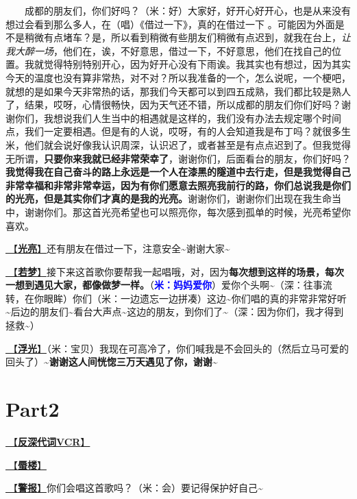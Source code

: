 \documentclass[]{ctexbook}
\begin{document}
  成都的朋友们，你们好吗？（米：好）大家好，好开心好开心，也是从来没有想过会看到那么多人，在（唱）《借过一下》，真的在借过一下 。可能因为外面是不是稍微有点堵车？是，所以看到稍微有些朋友们稍微有点迟到，就我在台上，\emph{让我大醉一场}，他们在，诶，不好意思，借过一下，不好意思，他们在找自己的位置。我就觉得特别特别开心，因为好开心没有下雨诶。我其实也有想过，因为其实今天的温度也没有算非常热，对不对？所以我准备的一个，怎么说呢，一个梗吧，就想的是如果今天非常热的话，那我们今天都可以到四五成熟，我们都比较是熟人了，结果，哎呀，心情很畅快，因为天气还不错，所以成都的朋友们你们好吗？谢谢你们，我想说我们人生当中的相遇就是这样的，我们没有办法去规定哪个时间点，我们一定要相遇。但是有的人说，哎呀，有的人会知道我是布丁吗？就很多生米，他们就会说好像我认识周深，认识迟了，或者甚至是有点点迟到了。但我觉得无所谓，\textbf{只要你来我就已经非常荣幸了}，谢谢你们，后面看台的朋友，你们好吗？\textbf{我觉得我在自己奋斗的路上永远是一个人在漆黑的隧道中去行走，但是我觉得自己非常幸福和非常非常幸运，因为有你们愿意去照亮我前行的路，你们总说我是你们的光亮，但是其实你们才真的是我的光亮。}谢谢你们，谢谢你们出现在我生命当中，谢谢你们。那这首光亮希望也可以照亮你，每次感到孤单的时候，光亮希望你喜欢。

\hyperref[silver-linings]{🎵【\textbf{光亮}】}还有朋友在借过一下，注意安全\textasciitilde 谢谢大家\textasciitilde{}

\hyperref[ruomeng]{🎵【\textbf{若梦}】}接下来这首歌你要帮我一起唱哦，对，因为\textbf{每次想到这样的场景，每次一想到遇见大家，都像做梦一样。}（\textbf{\textcolor{blue}{米：妈妈爱你}}）爱你个头啊\textasciitilde（深：往事流转，在你眼眸）你们（米：一边遗忘一边拼凑）这边\textasciitilde 你们唱的真的非常非常好听\textasciitilde 后边的朋友们\textasciitilde 看台大声点\textasciitilde 这边的朋友，到你们了\textasciitilde（深：因为你们，我才得到拯救\textasciitilde）

\hyperref[floating-light]{🎵【\textbf{浮光}】}（米：宝贝）我现在可高冷了，你们喊我是不会回头的（然后立马可爱的回头了）\textasciitilde{}\textbf{谢谢这人间恍惚三万天遇见了你，谢谢\textasciitilde{}}

\section{Part2}\label{chengdu-20240615-part2}

\hyperref[senself-vcr]{🎥【\textbf{反深代词VCR}】}

\hyperref[mirage]{🎵【\textbf{蜃楼}】}

\hyperref[the-giver]{🎵【\textbf{警报}】}你们会唱这首歌吗？（米：会）要记得保护好自己\textasciitilde{}
\end{document}
